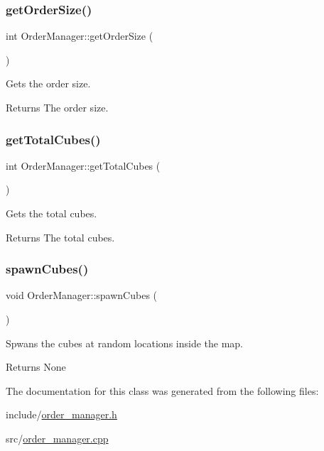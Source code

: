 \subsubsection{\texorpdfstring{get\+Order\+Size()}{getOrderSize()}}
{\footnotesize\ttfamily int Order\+Manager\+::get\+Order\+Size (\begin{DoxyParamCaption}{ }\end{DoxyParamCaption})}



Gets the order size. 

\begin{DoxyReturn}{Returns}
The order size. 
\end{DoxyReturn}
\mbox{\label{class_order_manager_a51d165c55a86aca5d29f217ca7585a2d}} 
\subsubsection{\texorpdfstring{get\+Total\+Cubes()}{getTotalCubes()}}
{\footnotesize\ttfamily int Order\+Manager\+::get\+Total\+Cubes (\begin{DoxyParamCaption}{ }\end{DoxyParamCaption})}



Gets the total cubes. 

\begin{DoxyReturn}{Returns}
The total cubes. 
\end{DoxyReturn}
\mbox{\label{class_order_manager_a0e643b3d4d311537d3f04d2c66661576}} 
\subsubsection{\texorpdfstring{spawn\+Cubes()}{spawnCubes()}}
{\footnotesize\ttfamily void Order\+Manager\+::spawn\+Cubes (\begin{DoxyParamCaption}{ }\end{DoxyParamCaption})}



Spwans the cubes at random locations inside the map. 

\begin{DoxyReturn}{Returns}
None 
\end{DoxyReturn}


The documentation for this class was generated from the following files\+:\begin{DoxyCompactItemize}
\item 
include/\hyperlink{order__manager_8h}{order\+\_\+manager.\+h}\item 
src/\hyperlink{order__manager_8cpp}{order\+\_\+manager.\+cpp}\end{DoxyCompactItemize}
